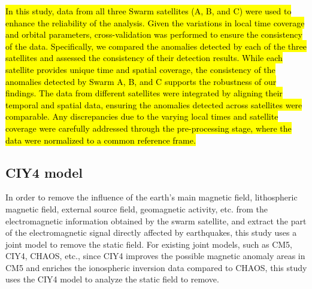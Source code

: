 \documentclass[3p,authoryear,preprint,12pt]{elsarticle}
\begin{document}
\hl{In this study, data from all three Swarm satellites (A, B, and C) were used to enhance the reliability of the analysis. Given the variations in local time coverage and orbital parameters, cross-validation was performed to ensure the consistency of the data. Specifically, we compared the anomalies detected by each of the three satellites and assessed the consistency of their detection results. While each satellite provides unique time and spatial coverage, the consistency of the anomalies detected by Swarm A, B, and C supports the robustness of our findings. The data from different satellites were integrated by aligning their temporal and spatial data, ensuring the anomalies detected across satellites were comparable. Any discrepancies due to the varying local times and satellite coverage were carefully addressed through the pre-processing stage, where the data were normalized to a common reference frame.}
\subsection{CIY4 model}

{In order to remove the influence of the earth's main magnetic field, lithospheric magnetic field, external source field, geomagnetic activity, etc. from the electromagnetic information obtained by the swarm satellite, and extract the part of the electromagnetic signal directly affected by earthquakes, this study uses a joint model to remove the static field. For existing joint models, such as CM5, CIY4, CHAOS, etc., since CIY4 improves the possible magnetic anomaly areas in CM5 and enriches the ionospheric inversion data compared to CHAOS, this study uses the CIY4 model to analyze the static field to remove.}
\end{document}
